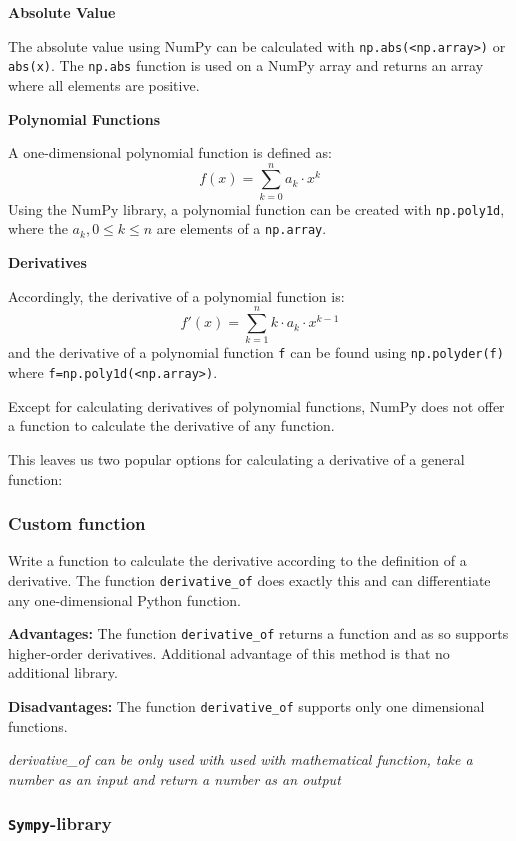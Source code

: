 \documentclass[11pt]{article}
\begin{document}
\textbf{Absolute Value}

The absolute value using NumPy can be calculated with
\texttt{np.abs(\textless{}np.array\textgreater{})} or \texttt{abs(x)}.
The \texttt{np.abs} function is used on a NumPy array and returns an
array where all elements are positive.

\textbf{Polynomial Functions}

A one-dimensional polynomial function is defined as:
\[f(x)=\sum_{k=0}^{n} a_k \cdot x^k\] Using the NumPy library, a
polynomial function can be created with \texttt{np.poly1d}, where the
\(a_k, 0 \leq k \leq n\) are elements of a \texttt{np.array}.

\textbf{Derivatives}

Accordingly, the derivative of a polynomial function is:
\[f'(x) = \sum_{k=1}^{n} k \cdot a_k \cdot x^{k-1}\] and the derivative
of a polynomial function \texttt{f} can be found using
\texttt{np.polyder(f)} where
\texttt{f=np.poly1d(\textless{}np.array\textgreater{})}.

Except for calculating derivatives of polynomial functions, NumPy does
not offer a function to calculate the derivative of any function.

This leaves us two popular options for calculating a derivative of a
general function:

\subsubsection{Custom function}\label{custom-function}

Write a function to calculate the derivative according to the definition
of a derivative. The function \texttt{derivative\_of} does exactly this
and can differentiate any one-dimensional Python function.

\textbf{Advantages:} The function \texttt{derivative\_of} returns a
function and as so supports higher-order derivatives. Additional
advantage of this method is that no additional library.

\textbf{Disadvantages:} The function \texttt{derivative\_of} supports
only one dimensional functions.

\emph{derivative\_of can be only used with used with mathematical
function, take a number as an input and return a number as an output}

\subsubsection{\texorpdfstring{\texttt{Sympy}-library}{Sympy-library}}\label{sympy-library}
\end{document}
